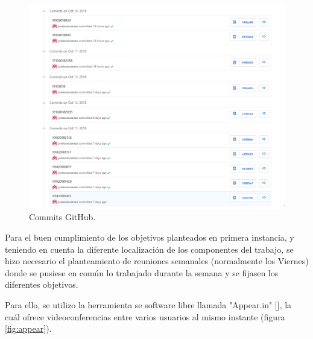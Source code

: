 \begin{figure}[H]
	\center
	\includegraphics[trim = 0mm 0mm 0mm 0mm, clip,scale=0.5]{imagenes/Introduction/CapturaGit}
	\caption{Commits GitHub.}
	\label{fig:capturaGit}
\end{figure}

Para el buen cumplimiento de los objetivos planteados en primera instancia, y teniendo en cuenta la diferente localización de los componentes del trabajo, se hizo necesario el planteamiento de reuniones semanales (normalmente los Viernes) donde se pusiese en común lo trabajado durante la semana y se fijasen los diferentes objetivos. \newline

Para ello, se utilizo la herramienta se software libre llamada "Appear.in" [], la cuál ofrece videoconferencias entre varios usuarios al mismo instante (figura \ref{fig:appear}). 

